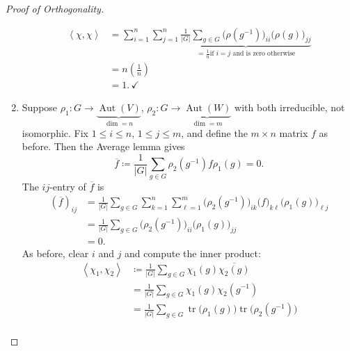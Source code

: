 \documentclass[12pt]{article}
\newcommand\inv[1]{#1^{-1}}
\newcommand{\vbrack}[1]{\left \langle #1 \right \rangle}
\theoremstyle{definition}
\DeclareMathOperator\Aut{Aut}
\DeclareMathOperator\tr{tr}
\begin{document}
\begin{proof}[Proof of Orthogonality]
\begin{enumerate}
        \begin{equation}
            \begin{split}
                \vbrack{\chi , \chi} & = 
                \sum\limits_{i = 1}^n \sum\limits_{j = 1}^n \underbrace{ \frac{1}{|G|} \sum\limits_{g \in G} \big( \rho \left( \inv{g} \right) \big)_{i i} \big( \rho(g) \big)_{j j} }_{ = \frac{1}{n} \text{if $i = j$ and is zero otherwise} } \\
                & = n \left( \frac{1}{n} \right) \\
                & = \boxed{1.} \, \checkmark
            \end{split}
        \end{equation}
        \item Suppose $\rho_1 : G \to \underbrace{\Aut(V)}_{\dim = n}$, $\rho_2 : G \to \underbrace{\Aut(W)}_{\dim = m}$ with both irreducible, not isomorphic. Fix $1 \leq i \leq n$, $1 \leq j \leq m$, and define the $m \times n$ matrix $f$ as before. Then the Average lemma gives 
        \begin{equation}
            \overline{f} \coloneqq  \frac{1}{|G|} \sum\limits_{g \in G} \rho_2 \left( \inv{g} \right) f \rho_1(g) = 0.
        \end{equation}
        The $ij$-entry of $\overline{f}$ is 
        \begin{equation}
            \begin{split}
                \left( \overline{f} \right)_{ij} & = \frac{1}{|G|} \sum\limits_{g \in G} \sum\limits_{k = 1}^n \sum\limits_{\ell = 1}^m \big( \rho_2 \left( \inv{g} \right) \big)_{i k} \big( f \big)_{k \ell} \big( \rho_1(g) \big)_{\ell j} \\
                & = \frac{1}{|G|} \sum\limits_{g \in G} \big( \rho_2 \left( \inv{g} \right) \big)_{i i} \big( \rho_1(g) \big)_{j j} \\
                & = 0.
            \end{split}
        \end{equation}
        As before, clear $i$ and $j$ and compute the inner product:
        \begin{equation}
            \begin{split}
                \vbrack{\chi_1 , \chi_2} & \coloneqq  \frac{1}{|G|} \sum\limits_{g \in G} \chi_1(g) \overline{\chi_2(g)} \\
                & = \frac{1}{|G|} \sum\limits_{g \in G} \chi_1(g) \chi_2 \left( \inv{g} \right) \\
                & = \frac{1}{|G|} \sum\limits_{g \in G} \tr \big( \rho_1(g) \big) \tr \big( \rho_2 \left( \inv{g} \right) \big) \\

\end{split}
\end{equation}
\end{enumerate}
\end{proof}
\end{document}
